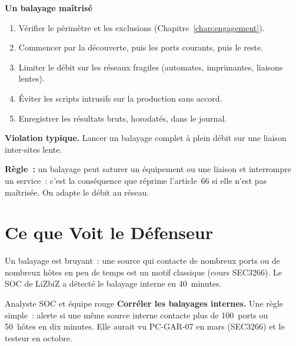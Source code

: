 \begin{boxprocedure}
\textbf{Un balayage maîtrisé}
\begin{enumerate}
    \item Vérifier le périmètre et les exclusions (Chapitre~\ref{chap:engagement}).
    \item Commencer par la découverte, puis les ports courants, puis le reste.
    \item Limiter le débit sur les réseaux fragiles (automates, imprimantes,
          liaisons lentes).
    \item Éviter les scripts intrusifs sur la production sans accord.
    \item Enregistrer les résultats bruts, horodatés, dans le journal.
\end{enumerate}
\end{boxprocedure}

\begin{boxalert}
\textbf{Violation typique.} Lancer un balayage complet à plein débit sur
une liaison inter-sites lente.

\smallskip
\textbf{Règle~:} un balayage peut saturer un équipement ou une liaison et
interrompre un service~: c'est la conséquence que réprime l'article~66 si
elle n'est pas maîtrisée. On adapte le débit au réseau.
\end{boxalert}

\section{Ce que Voit le Défenseur}
\label{sec:c06-defenseur}

Un balayage est bruyant~: une source qui contacte de nombreux ports ou de
nombreux hôtes en peu de temps est un motif classique (cours SEC3266). Le
SOC de LiZbiZ a détecté le balayage interne en 40~minutes.

\begin{boxmetier}{Analyste SOC et équipe rouge}
\textbf{Corréler les balayages internes.} Une règle simple~: alerte si une
même source interne contacte plus de 100~ports ou 50~hôtes en dix minutes.
Elle aurait vu PC-GAR-07 en mars (SEC3266) et le testeur en octobre.
\end{boxmetier}

\separateur

